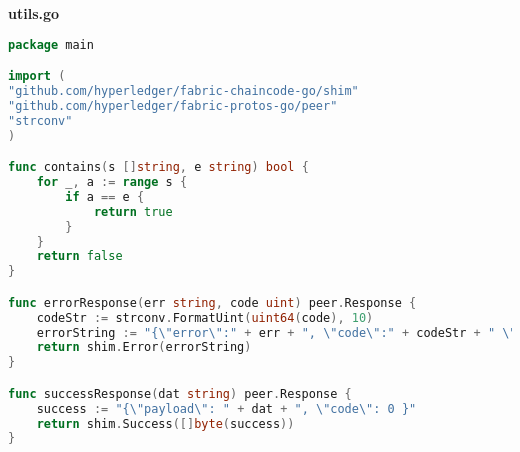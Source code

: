 \textbf{utils.go}
\begin{lstlisting}[language=Go]
package main

import (
"github.com/hyperledger/fabric-chaincode-go/shim"
"github.com/hyperledger/fabric-protos-go/peer"
"strconv"
)

func contains(s []string, e string) bool {
	for _, a := range s {
		if a == e {
			return true
		}
	}
	return false
}

func errorResponse(err string, code uint) peer.Response {
	codeStr := strconv.FormatUint(uint64(code), 10)
	errorString := "{\"error\":" + err + ", \"code\":" + codeStr + " \" }"
	return shim.Error(errorString)
}

func successResponse(dat string) peer.Response {
	success := "{\"payload\": " + dat + ", \"code\": 0 }"
	return shim.Success([]byte(success))
}

\end{lstlisting}
